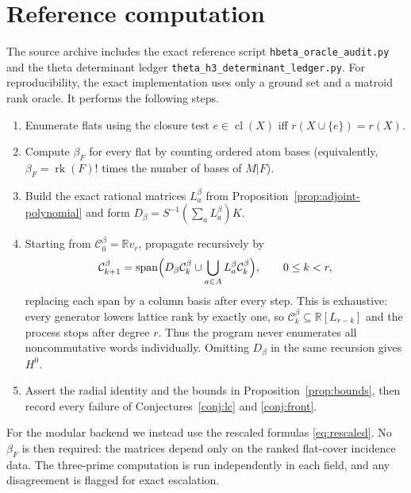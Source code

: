 \documentclass[11pt]{amsart}
\theoremstyle{definition}
\theoremstyle{remark}
\newcommand{\R}{\mathbb{R}}
\newcommand{\cc}{\mathcal}
\DeclareMathOperator{\rk}{rk}
\DeclareMathOperator{\cl}{cl}
\DeclareMathOperator{\Span}{span}
\begin{document}
\section{Reference computation}\label{app:algorithm}

The source archive includes the exact reference script \texttt{hbeta\_oracle\_audit.py} and the theta determinant ledger \texttt{theta\_h3\_determinant\_ledger.py}.  For reproducibility, the exact implementation uses only a ground set and a matroid rank oracle.  It performs the following steps.
\begin{enumerate}
\item Enumerate flats using the closure test $e\in\cl(X)$ iff $r(X\cup\{e\})=r(X)$.
\item Compute $\beta_F$ for every flat by counting ordered atom bases (equivalently, $\beta_F=\rk(F)!$ times the number of bases of $M|F$).
\item Build the exact rational matrices $L_a^\beta$ from Proposition~\ref{prop:adjoint-polynomial} and form $D_\beta=S^{-1}(\sum_aL_a^\beta)K$.
\item Starting from $\cc C_0^\beta=\R v_r$, propagate recursively by
\[
\cc C_{k+1}^\beta
=
\Span\Bigl(
D_\beta\cc C_k^\beta\cup
\bigcup_{a\in A}L_a^\beta\cc C_k^\beta
\Bigr),
\qquad 0\le k<r,
\]
replacing each span by a column basis after every step.  This is exhaustive: every generator lowers lattice rank by exactly one, so $\cc C_k^\beta\subseteq\R[L_{r-k}]$ and the process stops after degree $r$.  Thus the program never enumerates all noncommutative words individually.  Omitting $D_\beta$ in the same recursion gives $H^0$.
\item Assert the radial identity and the bounds in Proposition~\ref{prop:bounds}, then record every failure of Conjectures~\ref{conj:lc} and \ref{conj:front}.
\end{enumerate}
For the modular backend we instead use the rescaled formulas \eqref{eq:rescaled}.  No $\beta_F$ is then required: the matrices depend only on the ranked flat-cover incidence data.  The three-prime computation is run independently in each field, and any disagreement is flagged for exact escalation.
\end{document}

